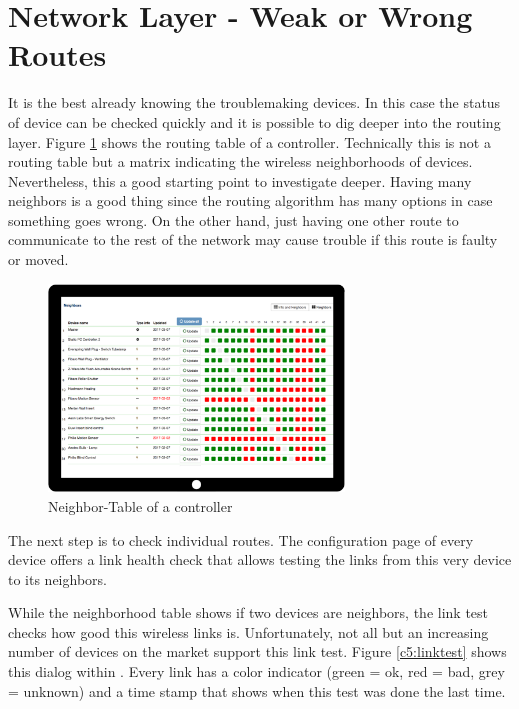 \section{Network Layer - Weak or Wrong Routes}

It is the best already knowing the troublemaking devices. In this case the status of device 
can be checked quickly and it is possible to dig deeper into the routing layer. 
Figure \ref{c5:neighbortable} shows the routing table of a controller. Technically 
this is not a routing table but a matrix indicating the wireless neighborhoods of devices.
Nevertheless, this a good starting point to investigate deeper. Having many neighbors 
is a good thing since the routing algorithm has many options in case something goes 
wrong. On the other hand, just having one other route to communicate to the rest of 
the network may cause trouble if this route is faulty or moved.

\begin{figure}
\begin{center}
\includegraphics[width=0.7\textwidth]{pngs/cap8/c3neighbortable.png}
\caption{Neighbor-Table of a controller}
\label{c5:neighbortable}
\end{center}
\end{figure}

The next step is to check individual routes. The configuration page of every device offers 
a link health check that allows testing the links from this very device to its neighbors.

While the neighborhood table shows if two devices are neighbors, the link test checks how
 good this wireless links is. Unfortunately, not all but an increasing number of devices 
 on the market support this link test. Figure \ref{c5:linktest} shows this dialog 
 within \zweui. Every link has a color indicator (green = ok, 
 red = bad, grey = unknown) and a time stamp that shows when this test was done the 
 last time.

